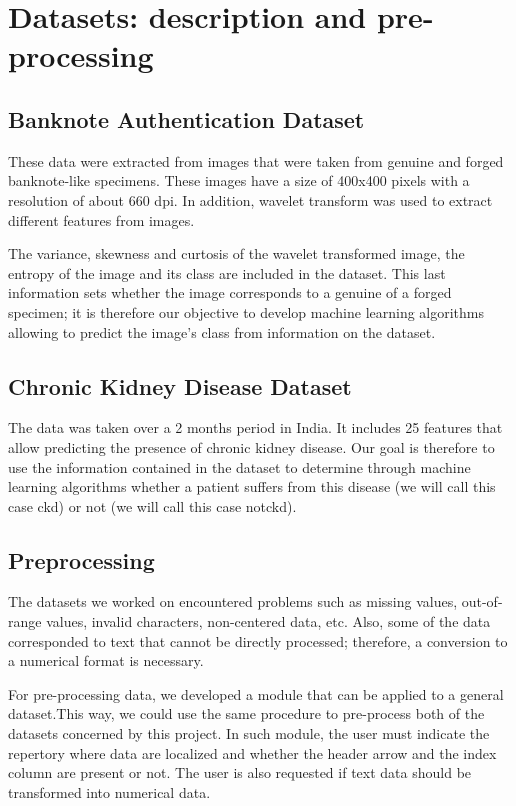 \documentclass[11pt,a4paper]{article}
\begin{document}
\section{Datasets: description and pre-processing}

\subsection{Banknote Authentication Dataset}
These data were extracted from images that were taken from genuine and forged banknote-like specimens. These images have a size of 400x400 pixels with a resolution of about 660 dpi. In addition, wavelet transform was used to extract different features from images.

The variance, skewness and curtosis of the wavelet transformed image, the entropy of the image and its class are included in the dataset. This last information sets whether the image corresponds to a genuine of a forged specimen; it is therefore our objective to develop machine learning algorithms allowing to predict the image's class from information on the dataset. 

\subsection{Chronic Kidney Disease Dataset}
The data was taken over a 2 months period in India. It includes 25 features that allow predicting the presence of chronic kidney disease. Our goal is therefore to use the information contained in the dataset to determine through machine learning algorithms whether a patient suffers from this disease (we will call this case ckd) or not (we will call this case notckd). 

\subsection{Preprocessing}

The datasets we worked on encountered problems such as missing values, out-of-range values, invalid characters, non-centered data, etc. Also, some of the data corresponded to text that cannot be directly processed; therefore, a conversion to a numerical format is necessary.

For pre-processing data, we developed a module that can be applied to a general dataset.This way, we could use the same procedure to pre-process both of the datasets concerned by this project. 
In such module, the user must indicate the repertory where data are localized and whether the header arrow and the index column are present or not. The user is also requested if text data should be transformed into numerical data. 
\end{document}
